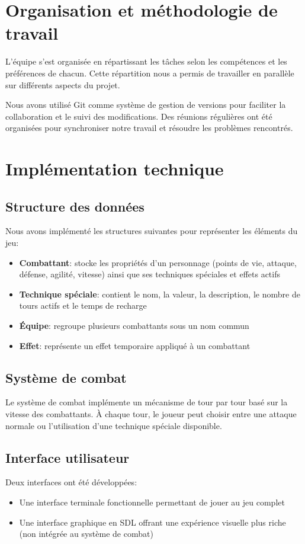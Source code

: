 \documentclass[12pt,a4paper]{article}
\begin{document}
\section{Organisation et méthodologie de travail}
L'équipe s'est organisée en répartissant les tâches selon les compétences et les préférences de chacun. Cette répartition nous a permis de travailler en parallèle sur différents aspects du projet.

Nous avons utilisé Git comme système de gestion de versions pour faciliter la collaboration et le suivi des modifications. Des réunions régulières ont été organisées pour synchroniser notre travail et résoudre les problèmes rencontrés.

\section{Implémentation technique}
\subsection{Structure des données}
Nous avons implémenté les structures suivantes pour représenter les éléments du jeu:
\begin{itemize}
    \item \textbf{Combattant}: stocke les propriétés d'un personnage (points de vie, attaque, défense, agilité, vitesse) ainsi que ses techniques spéciales et effets actifs
    \item \textbf{Technique spéciale}: contient le nom, la valeur, la description, le nombre de tours actifs et le temps de recharge
    \item \textbf{Équipe}: regroupe plusieurs combattants sous un nom commun
    \item \textbf{Effet}: représente un effet temporaire appliqué à un combattant
\end{itemize}

\subsection{Système de combat}
Le système de combat implémente un mécanisme de tour par tour basé sur la vitesse des combattants. À chaque tour, le joueur peut choisir entre une attaque normale ou l'utilisation d'une technique spéciale disponible.

\subsection{Interface utilisateur}
Deux interfaces ont été développées:
\begin{itemize}
    \item Une interface terminale fonctionnelle permettant de jouer au jeu complet
    \item Une interface graphique en SDL offrant une expérience visuelle plus riche (non intégrée au système de combat)
\end{itemize}
\end{document}
